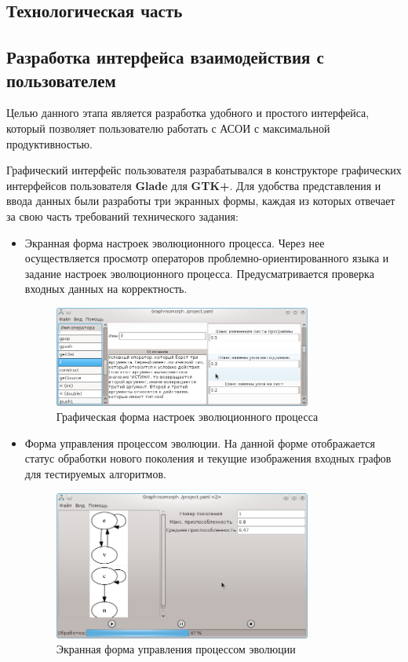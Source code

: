 \documentclass[russian,utf8,emptystyle]{eskdtext}
\begin{document}
\begin{spacing}{1.5}
\newpage
\section{Технологическая часть}
\subsection{Разработка интерфейса взаимодействия с пользователем}
Целью данного этапа является разработка удобного и простого интерфейса, который позволяет пользователю работать с АСОИ с максимальной продуктивностью.

Графический интерфейс пользователя разрабатывался в конструкторе графических интерфейсов пользователя \textbf{Glade} для \textbf{GTK+}. Для удобства представления и ввода данных были разработы три экранных формы, каждая из которых отвечает за свою часть требований технического задания:
\begin{itemize}
\item Экранная форма настроек эволюционного процесса. Через нее осуществляется просмотр операторов проблемно-ориентированного языка и задание настроек эволюционного процесса. Предусматривается проверка входных данных на корректность.
\begin{figure}[h!]
\centering
\includegraphics[width=0.8\textwidth]{screen07}
\caption{Графическая форма настроек эволюционного процесса}
\end{figure}

\item Форма управления процессом эволюции. На данной форме отображается статус обработки нового поколения и текущие изображения входных графов для тестируемых алгоритмов.
\begin{figure}[h!]
\centering
\includegraphics[width=0.8\textwidth]{screen09}
\caption{Экранная форма управления процессом эволюции}
\end{figure}



\end{itemize}
\end{spacing}
\end{document}
